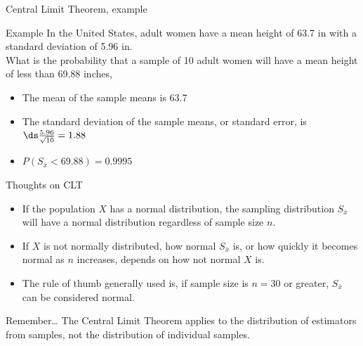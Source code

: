 \documentclass[xcolor=table, handout]{beamer}
\begin{document}
\begin{frame}{Central Limit Theorem, example}
\begin{exampleblock}{Example}
In the United States, adult women have a mean height of 63.7 in with a standard deviation of 5.96 in. \\
\medskip
What is the probability that a sample of 10 adult women will have a mean height of less than 69.88 inches,
\begin{itemize}
\pause\item The mean of the sample means is 63.7
\pause\item The standard deviation of the sample means, or standard error, is $\ds \frac {5.96}{\sqrt{10}} = 1.88$  
\pause\item $P(S_{\bar x} < 69.88) = 0.9995$
\end{itemize}
\end{exampleblock}

\end{frame}

\begin{frame}{Thoughts on CLT}
\begin{block}{}
\begin{itemize}
\item If the population $X$ has a normal distribution, the sampling distribution $S_{\bar x}$ will have a normal distribution regardless of sample size $n$.
\pause\item If $X$ is not normally distributed, how normal $S_{\bar x}$ is, or how quickly it becomes normal as $n$ increases, depends on how not normal $X$ is.
\pause\item The rule of thumb generally used is, if sample size is $n=30$ or greater, $S_{\bar x}$ can be considered normal.
\end{itemize}

\end{block}

\pause
\begin{alertblock}{Remember\ldots}
The Central Limit Theorem applies to the distribution of estimators from samples, not the distribution of individual samples.
\end{alertblock}
\end{frame}
\end{document}

